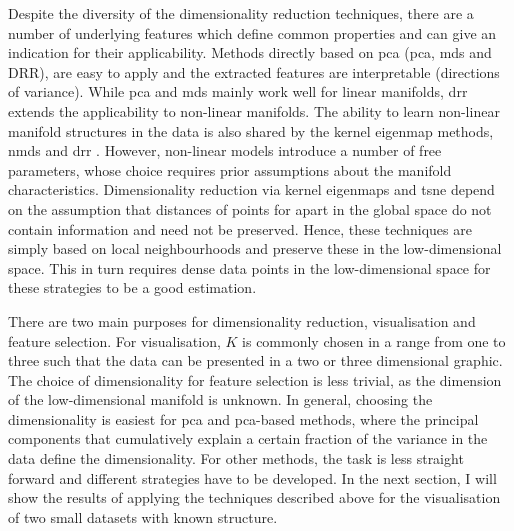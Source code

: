 Despite the diversity of the dimensionality reduction techniques, there are a number of underlying features which define common properties and can give an indication for their applicability. Methods directly based on \gls{pca} (\gls{pca}, \gls{mds} and DRR), are easy to apply and the extracted features are interpretable (directions of variance). While \gls{pca} and \gls{mds} mainly work well for linear manifolds, \gls{drr} extends the applicability to non-linear manifolds. The ability to learn non-linear manifold structures in the data is also shared by the kernel eigenmap methods, \gls{nmds} and \gls{drr} \citep{Coifman2006}. However, non-linear models introduce a number of free parameters, whose choice requires prior assumptions about the manifold characteristics. Dimensionality reduction via kernel eigenmaps and \gls{tsne} depend on the assumption that distances of points for apart in the global space do not contain information and need not be preserved. Hence, these techniques are simply based on local neighbourhoods and preserve these in the low-dimensional space. This in turn requires dense data points in the low-dimensional space for these strategies to be a good estimation. 

There are two main purposes for dimensionality reduction, visualisation and feature selection.  For visualisation, \(K\) is commonly chosen in a range from one to three such that the data can be presented in a two or three dimensional graphic. The choice of dimensionality for feature selection is less trivial, as the dimension of the low-dimensional manifold is unknown. In general, choosing the dimensionality is easiest for \gls{pca} and \gls{pca}-based methods, where the principal components that cumulatively explain a certain fraction of the variance in the data define the dimensionality. For other methods, the task is less straight forward and different strategies have to be developed.  In the next section, I will show the results of applying the techniques described above for the visualisation of two small datasets with known structure.
